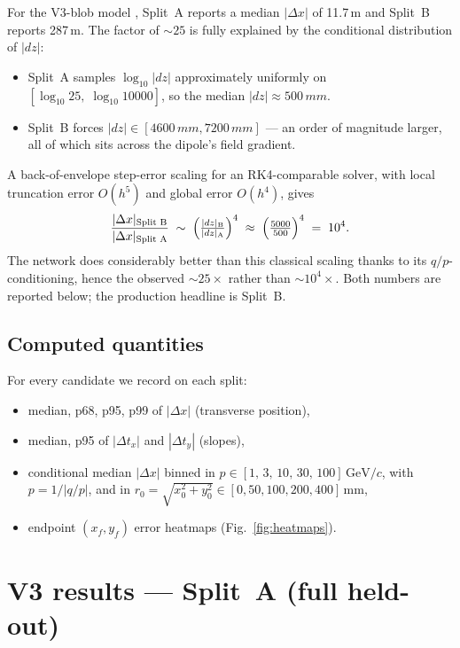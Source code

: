 \documentclass[11pt,a4paper]{article}
\providecommand{\micro}{\textmu}
\providecommand{\metre}{m}
\providecommand{\milli}{m}
\providecommand{\SI}[2]{#1\,#2}
\newcommand{\file}[1]{\texttt{\detokenize{#1}}}
\begin{document}
For the V3-blob model \file{pinn_v2_small_v1}, Split~A reports a
median $|\Delta x|$ of \SI{11.7}{\micro\metre} and Split~B reports
\SI{287}{\micro\metre}. The factor of $\sim 25$ is fully explained by
the conditional distribution of $|dz|$:
\begin{itemize}[topsep=2pt,itemsep=1pt]
  \item Split~A samples $\log_{10}|dz|$ approximately uniformly on
        $[\log_{10}25,\;\log_{10}10000]$, so the median
        $|dz|\approx \SI{500}{\milli\metre}$.
  \item Split~B forces $|dz|\in[\SI{4600}{\milli\metre},\SI{7200}{\milli\metre}]$ —
        an order of magnitude larger, all of which sits across the
        dipole's field gradient.
\end{itemize}
A back-of-envelope step-error scaling for an RK4-comparable solver,
with local truncation error $O(h^{5})$ and global error $O(h^{4})$,
gives
\[
  \frac{|\Delta x|_{\text{Split B}}}{|\Delta x|_{\text{Split A}}}
  \;\sim\;
  \Bigl(\tfrac{|dz|_{\text{B}}}{|dz|_{\text{A}}}\Bigr)^{4}
  \;\approx\; \Bigl(\tfrac{5000}{500}\Bigr)^{4} \;=\; 10^{4}.
\]
The network does considerably better than this classical scaling
thanks to its $q/p$-conditioning, hence the observed $\sim 25\times$
rather than $\sim 10^{4}\times$. Both numbers are reported below; the
production headline is Split~B.

\subsection{Computed quantities}

For every candidate we record on each split:
\begin{itemize}[topsep=2pt,itemsep=1pt]
  \item median, p68, p95, p99 of $|\Delta x|$ (transverse position),
  \item median, p95 of $|\Delta t_x|$ and $|\Delta t_y|$ (slopes),
  \item conditional median $|\Delta x|$ binned in
        $p\in[1,\,3,\,10,\,30,\,100]\,\mathrm{GeV}/c$, with
        $p=1/|q/p|$, and in
        $r_0=\sqrt{x_0^{2}+y_0^{2}}\in[0,50,100,200,400]\,\mathrm{mm}$,
  \item endpoint $(x_f,y_f)$ error heatmaps (Fig.~\ref{fig:heatmaps}).
\end{itemize}

\section{V3 results — Split~A (full held-out)}
\label{sec:splitA}
\end{document}
